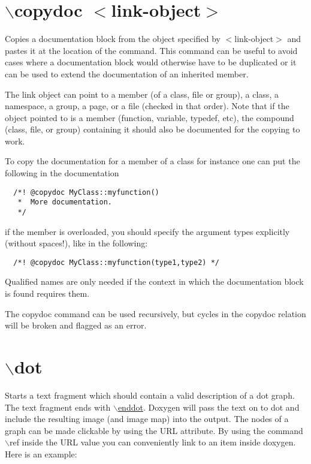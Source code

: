  \hypertarget{commands_cmdcopydoc}{}\section{$\backslash$copydoc $<$link-object$>$}\label{commands_cmdcopydoc}
 Copies a documentation block from the object specified by $<$link-object$>$ and pastes it at the location of the command. This command can be useful to avoid cases where a documentation block would otherwise have to be duplicated or it can be used to extend the documentation of an inherited member.

The link object can point to a member (of a class, file or group), a class, a namespace, a group, a page, or a file (checked in that order). Note that if the object pointed to is a member (function, variable, typedef, etc), the compound (class, file, or group) containing it should also be documented for the copying to work.

To copy the documentation for a member of a class for instance one can put the following in the documentation



\footnotesize\begin{verbatim}
  /*! @copydoc MyClass::myfunction() 
   *  More documentation.
   */
\end{verbatim}
\normalsize


if the member is overloaded, you should specify the argument types explicitly (without spaces!), like in the following:



\footnotesize\begin{verbatim}
  /*! @copydoc MyClass::myfunction(type1,type2) */
\end{verbatim}
\normalsize


Qualified names are only needed if the context in which the documentation block is found requires them.

The copydoc command can be used recursively, but cycles in the copydoc relation will be broken and flagged as an error.



 \hypertarget{commands_cmddot}{}\section{$\backslash$dot}\label{commands_cmddot}
 Starts a text fragment which should contain a valid description of a dot graph. The text fragment ends with \hyperlink{commands_cmdenddot}{$\backslash$enddot}. Doxygen will pass the text on to dot and include the resulting image (and image map) into the output. The nodes of a graph can be made clickable by using the URL attribute. By using the command $\backslash$ref inside the URL value you can conveniently link to an item inside doxygen. Here is an example: 

